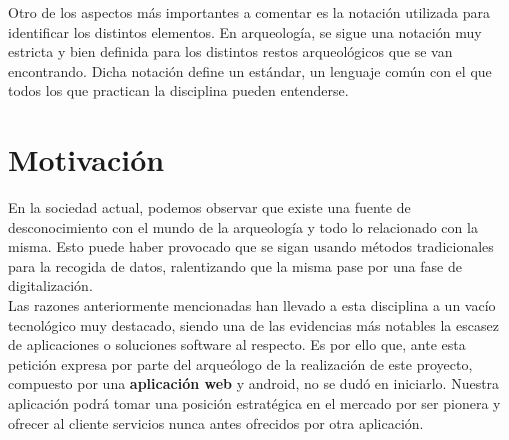 Otro de los aspectos más importantes a comentar es la notación utilizada para identificar los
distintos elementos. En arqueología, se sigue una notación muy estricta y bien definida para
los distintos restos arqueológicos que se van encontrando. Dicha notación define un estándar,
un lenguaje común con el que todos los que practican la disciplina pueden entenderse.

\section{Motivación}
En la sociedad actual, podemos observar que existe una fuente de desconocimiento con el mundo
de la arqueología y todo lo relacionado con la misma. Esto puede haber provocado que se sigan
usando métodos tradicionales para la recogida de datos, ralentizando que la misma pase por una
fase de digitalización. \\

Las razones anteriormente mencionadas han llevado a esta disciplina a un vacío tecnológico muy
destacado, siendo una de las evidencias más notables la escasez de aplicaciones o soluciones
software al respecto. Es por ello que, ante esta petición expresa por parte del arqueólogo
de la realización de este proyecto, compuesto por una \textbf{aplicación web} y android, no se
dudó en iniciarlo. Nuestra aplicación podrá tomar una posición estratégica en el mercado por
ser pionera y ofrecer al cliente servicios nunca antes ofrecidos por otra aplicación.
